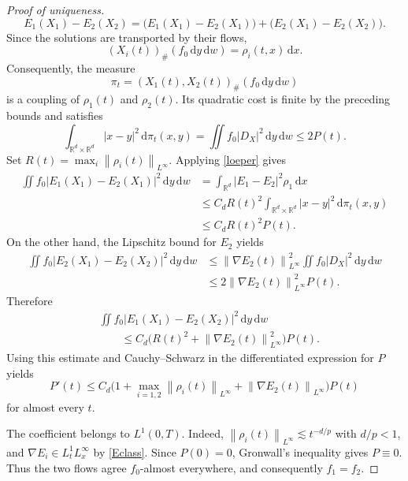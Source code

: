 \documentclass[11pt]{article}
\newcommand{\R}{\mathbb R}
\newcommand{\norm}[1]{\left\lVert #1\right\rVert}
\newcommand{\dd}{\,\mathrm d}
\begin{document}
\begin{proof}[Proof of uniqueness]
\begin{equation*}
 E_1(X_1)-E_2(X_2)
 =\big(E_1(X_1)-E_2(X_1)\big)
  +\big(E_2(X_1)-E_2(X_2)\big).
\end{equation*}
Since the solutions are transported by their flows,
\begin{equation*}
 (X_i(t))_\#(f_0\dd y\dd w)=\rho_i(t,x)\dd x.
\end{equation*}
Consequently, the measure
\begin{equation*}
 \pi_t=(X_1(t),X_2(t))_\#(f_0\dd y\dd w)
\end{equation*}
is a coupling of $\rho_1(t)$ and $\rho_2(t)$.  Its quadratic cost
is finite by the preceding bounds and satisfies
\begin{equation*}
 \int_{\R^d\times\R^d}|x-y|^2\dd\pi_t(x,y)
 =\iint f_0|D_X|^2\dd y\dd w\leq2P(t).
\end{equation*}
Set $R(t)=\max_i\norm{\rho_i(t)}_{L^\infty}$.  Applying
\eqref{loeper} gives
\begin{align*}
 \iint f_0|E_1(X_1)-E_2(X_1)|^2\dd y\dd w
 &=\int_{\R^d}|E_1-E_2|^2\rho_1\dd x\\
 &\leq C_dR(t)^2
 \int_{\R^d\times\R^d}|x-y|^2\dd\pi_t(x,y)\\
 &\leq C_dR(t)^2P(t).
\end{align*}
On the other hand, the Lipschitz bound for $E_2$ yields
\begin{align*}
 \iint f_0|E_2(X_1)-E_2(X_2)|^2\dd y\dd w
 &\leq\norm{\nabla E_2(t)}_{L^\infty}^2
 \iint f_0|D_X|^2\dd y\dd w\\
 &\leq2\norm{\nabla E_2(t)}_{L^\infty}^2P(t).
\end{align*}
Therefore
\begin{align*}
 &\iint f_0|E_1(X_1)-E_2(X_2)|^2\dd y\dd w\\
 &\qquad\leq
 C_d\bigl(R(t)^2+\norm{\nabla E_2(t)}_{L^\infty}^2\bigr)P(t).
\end{align*} 
 Using this estimate and Cauchy--Schwarz in the
differentiated expression for $P$ yields
\begin{equation}\label{Pgronwall}
 P'(t)\leq C_d\Big(1+\max_{i=1,2}\norm{\rho_i(t)}_{L^\infty}
                    +\norm{\nabla E_2(t)}_{L^\infty}\Big)P(t)
\end{equation}
 for almost every $t$.

The coefficient belongs to $L^1(0,T)$.  Indeed,
 $\norm{\rho_i(t)}_{L^\infty}\lesssim t^{-d/p}$  with $d/p<1$, and
$\nabla E_i\in L^1_tL^\infty_x$ by \eqref{Eclass}.  Since $P(0)=0$,
Gronwall's inequality gives $P\equiv0$.  Thus the two flows agree
$f_0$-almost everywhere, and consequently $f_1=f_2$.
\end{proof}
\end{document}
